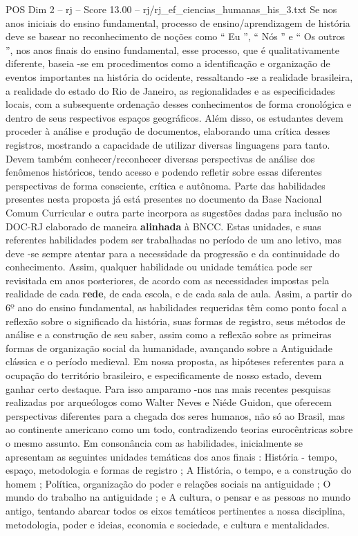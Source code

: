 \begin{textsample}{POS Dim 2 – rj – Score 13.00 – rj/rj\_ef\_ciencias\_humanas\_his\_3.txt}
Se nos anos iniciais do ensino fundamental, processo de ensino/aprendizagem de história deve se basear no reconhecimento de noções como “ Eu ”, “ Nós ” e “ Os outros ”, nos anos finais do ensino fundamental, esse processo, que é qualitativamente diferente, baseia -se em procedimentos como a identificação e organização de eventos importantes na história do ocidente, ressaltando -se a realidade brasileira, a realidade do estado do Rio de Janeiro, as regionalidades e as especificidades locais, com a subsequente ordenação desses conhecimentos de forma cronológica e dentro de seus respectivos espaços geográficos.
Além disso, os estudantes devem proceder à análise e produção de documentos, elaborando uma crítica desses registros, mostrando a capacidade de utilizar diversas linguagens para tanto.
Devem também conhecer/reconhecer diversas perspectivas de análise dos fenômenos históricos, tendo acesso e podendo refletir sobre essas diferentes perspectivas de forma consciente, crítica e autônoma.
Parte das habilidades presentes nesta proposta já está presentes no documento da Base Nacional Comum Curricular e outra parte incorpora as sugestões dadas para inclusão no DOC-RJ elaborado de maneira \textbf{alinhada} à BNCC.
Estas unidades, e suas referentes habilidades podem ser trabalhadas no período de um ano letivo, mas deve -se sempre atentar para a necessidade da progressão e da continuidade do conhecimento.
Assim, qualquer habilidade ou unidade temática pode ser revisitada em anos posteriores, de acordo com as necessidades impostas pela realidade de cada \textbf{rede}, de cada escola, e de cada sala de aula.
Assim, a partir do 6º ano do ensino fundamental, as habilidades requeridas têm como ponto focal a reflexão sobre o significado da história, suas formas de registro, seus métodos de análise e a construção de seu saber, assim como a reflexão sobre as primeiras formas de organização social da humanidade, avançando sobre a Antiguidade clássica e o período medieval.
Em nossa proposta, as hipóteses referentes para a ocupação do território brasileiro, e especificamente de nosso estado, devem ganhar certo destaque.
Para isso amparamo -nos nas mais recentes pesquisas realizadas por arqueólogos como Walter Neves e Niéde Guidon, que oferecem perspectivas diferentes para a chegada dos seres humanos, não só ao Brasil, mas ao continente americano como um todo, contradizendo teorias eurocêntricas sobre o mesmo assunto.
Em consonância com as habilidades, inicialmente se apresentam as seguintes unidades temáticas dos anos finais : História - tempo, espaço, metodologia e formas de registro ; A História, o tempo, e a construção do homem ; Política, organização do poder e relações sociais na antiguidade ; O mundo do trabalho na antiguidade ; e A cultura, o pensar e as pessoas no mundo antigo, tentando abarcar todos os eixos temáticos pertinentes a nossa disciplina, metodologia, poder e ideias, economia e sociedade, e cultura e mentalidades.

\end{textsample}
